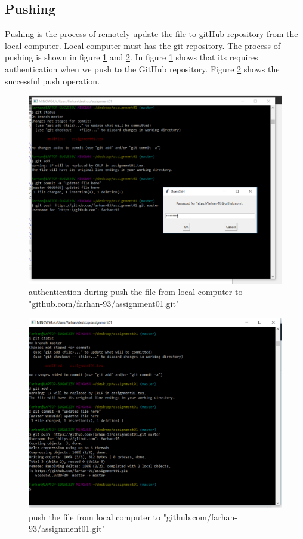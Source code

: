 \documentclass[paper=a4, fontsize=12pt]{scrartcl}
\numberwithin{equation}{section} %
\numberwithin{figure}{section} %
\numberwithin{table}{section} %
\begin{document}
\subsection{Pushing}
Pushing is the process of remotely update the file to gitHub repository from the local computer. Local computer must has the git repository. The process of pushing is shown in figure \ref{cpush} and \ref{cpush1}. In figure \ref{cpush} shows that its requires authentication when we push to the GitHub repository. Figure \ref{cpush1} shows the successful push operation.




\begin{figure}
\includegraphics[width=\linewidth]{push.png}
\caption{authentication during push the file from local computer to "github.com/farhan-93/assignment01.git"}
\label{cpush}
\end{figure}


\begin{figure}
\includegraphics[width=\linewidth]{push1.png}
\caption{push the file from local computer to "github.com/farhan-93/assignment01.git"}
\label{cpush1}
\end{figure}

\end{document}
